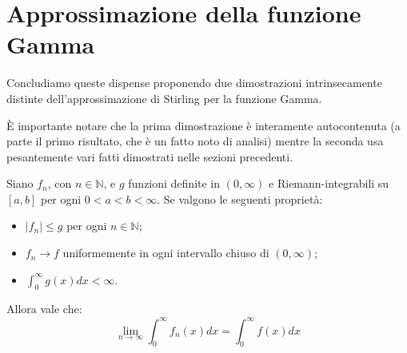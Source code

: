 \section{Approssimazione della funzione Gamma}
Concludiamo queste dispense proponendo due dimostrazioni intrinsecamente distinte dell'approssimazione di Stirling per
la funzione Gamma. 

È importante notare che la prima dimostrazione è interamente autocontenuta (a parte il primo risultato, che è un fatto
noto di analisi) mentre la seconda usa pesantemente vari fatti dimostrati nelle sezioni precedenti.

\begin{lemma}\label{ga:LimiteIntegrali}
	Siano $f_n$, con $n\in\mathbb{N}$, e $g$ funzioni definite in $(0,\infty)$ e Riemann-integrabili su $[a,b]$ per ogni
	$0<a<b<\infty$. Se valgono le seguenti proprietà:
	\begin{itemize}
		\item $|f_n|\le g$ per ogni $n\in\mathbb{N}$;
		\item $f_n\to f$ uniformemente in ogni intervallo chiuso di $(0,\infty)$;
		\item $\int_0^\infty{g(x)dx}<\infty$.
	\end{itemize}
	Allora vale che:
	\begin{equation*}
		\lim_{n\to\infty}\int_0^\infty f_n(x)dx=\int_0^\infty f(x)dx
	\end{equation*}
\end{lemma}

